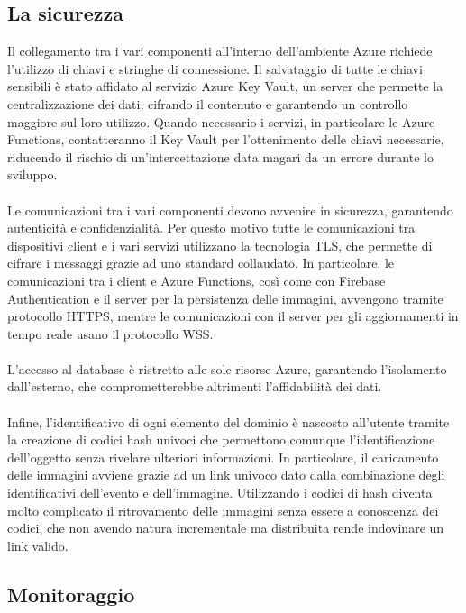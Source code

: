 \clearpage
\subsection{La sicurezza}

Il collegamento tra i vari componenti all’interno dell’ambiente Azure richiede l’utilizzo di chiavi e stringhe di connessione. 
Il salvataggio di tutte le chiavi sensibili è stato affidato al servizio Azure Key Vault,
 un server che permette la centralizzazione dei dati, cifrando il contenuto e garantendo un controllo maggiore sul loro utilizzo. 
Quando necessario i servizi, in particolare le Azure Functions, contatteranno il Key Vault per l’ottenimento delle chiavi necessarie, 
riducendo il rischio di un’intercettazione data magari da un errore durante lo sviluppo.\\
\\
Le comunicazioni tra i vari componenti devono avvenire in sicurezza, garantendo autenticità e confidenzialità. 
Per questo motivo tutte le comunicazioni tra dispositivi client e i vari servizi utilizzano la tecnologia TLS, che permette di cifrare i messaggi grazie ad uno standard collaudato. 
In particolare, le comunicazioni tra i client e Azure Functions, così come con Firebase Authentication e il server per la persistenza delle immagini, 
avvengono tramite protocollo HTTPS, mentre le comunicazioni con il server per gli aggiornamenti in tempo reale usano il protocollo WSS.\\
\\
L’accesso al database è ristretto alle sole risorse Azure, garantendo l’isolamento dall’esterno, che comprometterebbe altrimenti l’affidabilità dei dati.\\
\\
Infine, l’identificativo di ogni elemento del dominio è nascosto all’utente tramite la creazione di codici hash univoci 
che permettono comunque l’identificazione dell’oggetto senza rivelare ulteriori informazioni. 
In particolare, il caricamento delle immagini avviene grazie ad un link univoco dato dalla combinazione degli identificativi dell’evento e dell’immagine. 
Utilizzando i codici di hash diventa molto complicato il ritrovamento delle immagini senza essere a conoscenza dei codici, 
che non avendo natura incrementale ma distribuita rende indovinare un link valido.

\clearpage
\subsection{Monitoraggio}

